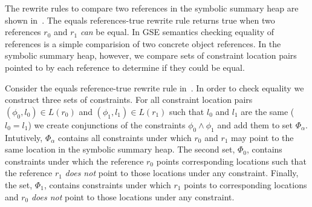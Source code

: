 \newsavebox{\boxPEX}


The rewrite rules to compare two references in the symbolic summary
heap are shown in~. The equals references-true rewrite
rule returns true when two references $r_0$ and $r_1$ \emph{can} be
equal. In GSE semantics checking equality of references is a simple
comparision of two concrete object references. In the symbolic summary
heap, however, we compare sets of constraint location pairs pointed to
by each reference to determine if they could be equal. 

Consider the equals reference-true rewrite rule
in~. In order to check equality we construct three
sets of constraints. For all constraint location pairs $(\phi_0, l_0)
\in L(r_0)$ and $(\phi_1, l_1) \in L(r_1)$ such that $l_0$ and $l_1$
are the same ($l_0 = l_1$) we create conjunctions of the constraints
$\phi_0 \wedge \phi_1$ and add them to set $\Phi_\alpha$. Intutively,
$\Phi_\alpha$ contains all constraints under which $r_0$ and $r_1$ may
point to the same location in the symbolic summary heap. The second
set, $\Phi_0$, contains constraints under which the reference $r_0$
points corresponding locations such that the reference $r_1$
\emph{does not} point to those locations under any
constraint. Finally, the set, $\Phi_1$, contains constraints under
which $r_1$ points to corresponding locations and $r_0$ \emph{does
  not} point to those locations under any constraint.

